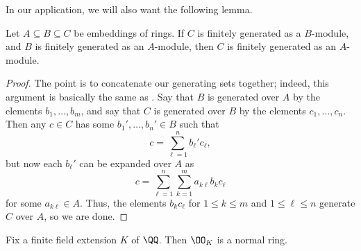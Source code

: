 \documentclass[../notes.tex]{subfiles}
\begin{document}
In our application, we will also want the following lemma.
\begin{lemma} \label{lem:finite-extension-transitive}
	Let $A\subseteq B\subseteq C$ be embeddings of rings. If $C$ is finitely generated as a $B$-module, and $B$ is finitely generated as an $A$-module, then $C$ is finitely generated as an $A$-module.
\end{lemma}
\begin{proof}
	The point is to concatenate our generating sets together; indeed, this argument is basically the same as . Say that $B$ is generated over $A$ by the elements $b_1,\ldots,b_m$, and say that $C$ is generated over $B$ by the elements $c_1,\ldots,c_n$. Then any $c\in C$ has some $b_1',\ldots,b_n'\in B$ such that
	\[c=\sum_{\ell=1}^nb_\ell'c_\ell,\]
	but now each $b_\ell'$ can be expanded over $A$ as
	\[c=\sum_{\ell=1}^n\sum_{k=1}^ma_{k\ell}b_kc_\ell\]
	for some $a_{k\ell}\in A$. Thus, the elements $b_kc_\ell$ for $1\le k\le m$ and $1\le\ell\le n$ generate $C$ over $A$, so we are done.
\end{proof}
\begin{corollary} \label{cor:o-k-normal-ring}
	Fix a finite field extension $K$ of $\QQ$. Then $\OO_K$ is a normal ring.
\end{corollary}
\end{document}
